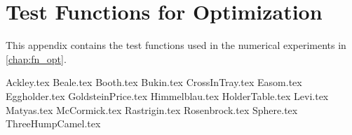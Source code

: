 \chapter{Test Functions for Optimization}
\label{app:test_functions}
  This appendix contains the test functions used in the numerical experiments in 
  \vref{chap:fn_opt}.

  {Ackley.tex}
  {Beale.tex}
  {Booth.tex}
  {Bukin.tex}
  {CrossInTray.tex}
  {Easom.tex}
  {Eggholder.tex}
  {GoldsteinPrice.tex}
  {Himmelblau.tex}
  {HolderTable.tex}
  {Levi.tex}
  {Matyas.tex}
  {McCormick.tex}
  {Rastrigin.tex}
  {Rosenbrock.tex}
  {Sphere.tex}
  {ThreeHumpCamel.tex}